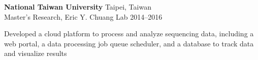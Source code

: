 \begin{entrylist}
\item \textbf{National Taiwan University} \hfill Taipei, Taiwan\\
Master's Research, Eric Y. Chuang Lab \hfill
2014--2016
\begin{detaillist}
    \item Developed a cloud platform to process and analyze sequencing data, including a web portal, a data processing job queue scheduler, and a database to track data and visualize results
\end{detaillist}


\end{entrylist}
